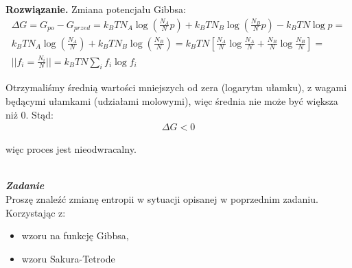 \documentclass[11pt,a4paper]{article}
\newcounter{zadanie}\newcommand{\zadanie}[1][]{\addtocounter{zadanie}{1} ~\\ {\bf \emph{Zadanie \arabic{zadanie} #1 }} \\}
\newenvironment{solution}{\vspace{1cm} \par\textbf{Rozwiązanie.} \vspace{1cm}}{}
\begin{document}
\begin{solution}
Zmiana potencjału Gibbsa:
\begin{align*}
  \Delta G = G_{po} - G_{przed} = 
  k_BT N_A \log\left( \frac{N_{A}}{N}p  \right) +
  k_BT N_B\log\left( \frac{N_{B}}{N}p \right) - 
  k_BT N \log p = \\
  k_BT N_A \log\left( \frac{N_{A}}{N} \right) +
  k_BT N_B\log\left( \frac{N_{B}}{N} \right) = 
  k_BT N \left[ \frac{N_A}{N} \log \frac{N_A}{N} + \frac{N_B}{N} \log \frac{N_B}{N} \right] = \\
  || f_i = \frac{N_i}{N} || = 
  k_BT N \sum_i f_i \log f_i
\end{align*}

Otrzymaliśmy średnią wartości mniejszych od zera 
(logarytm ułamku), z wagami będącymi ułamkami (udziałami molowymi),
więc średnia nie może być większa niż 0. Stąd:
\begin{align*}
  \Delta G < 0
\end{align*}

więc proces jest nieodwracalny.

\newpage
\end{solution}
\zadanie[]

Proszę znaleźć zmianę entropii w sytuacji opisanej w poprzednim zadaniu. 
Korzystając z:
\begin{itemize}
  \item wzoru na funkcję Gibbsa,
  \item wzoru Sakura-Tetrode 
\end{itemize}
\end{document}

